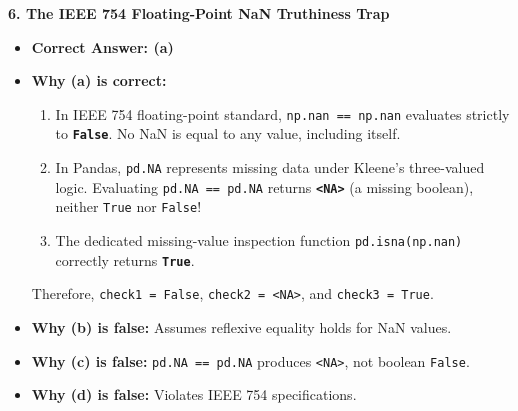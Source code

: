 \textbf{6. The IEEE 754 Floating-Point NaN Truthiness Trap}
\begin{itemize}
    \item \textbf{Correct Answer: (a)}
    \item \textbf{Why (a) is correct:}
    \begin{enumerate}
        \item In IEEE 754 floating-point standard, \texttt{np.nan == np.nan} evaluates strictly to \textbf{\texttt{False}}. No NaN is equal to any value, including itself.
        \item In Pandas, \texttt{pd.NA} represents missing data under Kleene's three-valued logic. Evaluating \texttt{pd.NA == pd.NA} returns \textbf{\texttt{<NA>}} (a missing boolean), neither \texttt{True} nor \texttt{False}!
        \item The dedicated missing-value inspection function \texttt{pd.isna(np.nan)} correctly returns \textbf{\texttt{True}}.
    \end{enumerate}
    Therefore, \texttt{check1 = False}, \texttt{check2 = <NA>}, and \texttt{check3 = True}.
    \item \textbf{Why (b) is false:} Assumes reflexive equality holds for NaN values.
    \item \textbf{Why (c) is false:} \texttt{pd.NA == pd.NA} produces \texttt{<NA>}, not boolean \texttt{False}.
    \item \textbf{Why (d) is false:} Violates IEEE 754 specifications.
\end{itemize}

